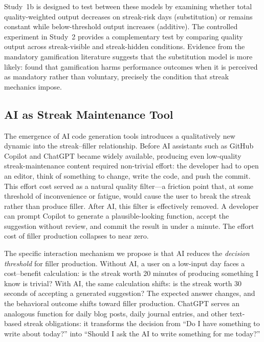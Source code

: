 \documentclass[12pt]{article}
\begin{document}
Study~1b is designed to test between these models by examining whether total quality-weighted output decreases on streak-risk days (substitution) or remains constant while below-threshold output increases (additive). The controlled experiment in Study~2 provides a complementary test by comparing quality output across streak-visible and streak-hidden conditions. Evidence from the mandatory gamification literature suggests that the substitution model is more likely: \citet{Mollick2014} found that gamification harms performance outcomes when it is perceived as mandatory rather than voluntary, precisely the condition that streak mechanics impose.

\subsection{AI as Streak Maintenance Tool}
\label{sec:ai-streak-tool}

The emergence of AI code generation tools introduces a qualitatively new dynamic into the streak--filler relationship. Before AI assistants such as GitHub Copilot and ChatGPT became widely available, producing even low-quality streak-maintenance content required non-trivial effort: the developer had to open an editor, think of something to change, write the code, and push the commit. This effort cost served as a natural quality filter---a friction point that, at some threshold of inconvenience or fatigue, would cause the user to break the streak rather than produce filler. After AI, this filter is effectively removed. A developer can prompt Copilot to generate a plausible-looking function, accept the suggestion without review, and commit the result in under a minute. The effort cost of filler production collapses to near zero.

The specific interaction mechanism we propose is that AI reduces the \emph{decision threshold} for filler production. Without AI, a user on a low-input day faces a cost--benefit calculation: is the streak worth 20 minutes of producing something I know is trivial? With AI, the same calculation shifts: is the streak worth 30 seconds of accepting a generated suggestion? The expected answer changes, and the behavioral outcome shifts toward filler production. ChatGPT serves an analogous function for daily blog posts, daily journal entries, and other text-based streak obligations: it transforms the decision from ``Do I have something to write about today?'' into ``Should I ask the AI to write something for me today?''
\end{document}
